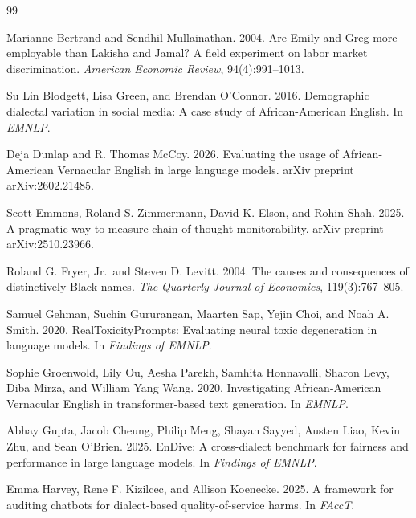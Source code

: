 \documentclass[10pt,a4paper,twocolumn]{article}
\begin{document}
\begin{thebibliography}{99}

Marianne Bertrand and Sendhil Mullainathan. 2004. Are Emily and Greg more employable than Lakisha and Jamal? A field experiment on labor market discrimination. \emph{American Economic Review}, 94(4):991--1013.

Su Lin Blodgett, Lisa Green, and Brendan O'Connor. 2016. Demographic dialectal variation in social media: A case study of African-American English. In \emph{EMNLP}.

Deja Dunlap and R. Thomas McCoy. 2026. Evaluating the usage of African-American Vernacular English in large language models. arXiv preprint arXiv:2602.21485.

Scott Emmons, Roland S. Zimmermann, David K. Elson, and Rohin Shah. 2025. A pragmatic way to measure chain-of-thought monitorability. arXiv preprint arXiv:2510.23966.

Roland G. Fryer, Jr.\ and Steven D. Levitt. 2004. The causes and consequences of distinctively Black names. \emph{The Quarterly Journal of Economics}, 119(3):767--805.

Samuel Gehman, Suchin Gururangan, Maarten Sap, Yejin Choi, and Noah A. Smith. 2020. RealToxicityPrompts: Evaluating neural toxic degeneration in language models. In \emph{Findings of EMNLP}.

Sophie Groenwold, Lily Ou, Aesha Parekh, Samhita Honnavalli, Sharon Levy, Diba Mirza, and William Yang Wang. 2020. Investigating African-American Vernacular English in transformer-based text generation. In \emph{EMNLP}.

Abhay Gupta, Jacob Cheung, Philip Meng, Shayan Sayyed, Austen Liao, Kevin Zhu, and Sean O'Brien. 2025. EnDive: A cross-dialect benchmark for fairness and performance in large language models. In \emph{Findings of EMNLP}.

Emma Harvey, Rene F. Kizilcec, and Allison Koenecke. 2025. A framework for auditing chatbots for dialect-based quality-of-service harms. In \emph{FAccT}.


\end{thebibliography}
\end{document}
